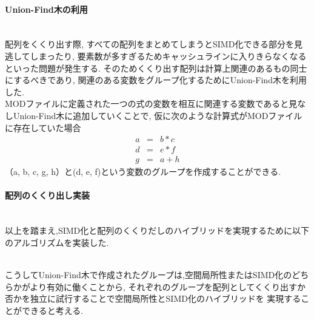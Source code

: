 \paragraph{Union-Find木の利用}~\\
配列をくくり出す際, すべての配列をまとめてしまうとSIMD化できる部分を見逃してしまったり,
要素数が多すぎるためキャッシュラインに入りきらなくなるといった問題が発生する.
そのためくくり出す配列は計算上関連のあるもの同士にするべきであり, 関連のある変数をグループ化するためにUnion-Find木を利用した.\\
MODファイルに定義された一つの式の変数を相互に関連する変数であると見なしUnion-Find木に追加していくことで, 仮に次のような計算式がMODファイルに存在していた場合
\begin{eqnarray}
  a &=& b * c\\
  d &=& e * f\\
  g &=& a + h
\label{eq:3x0}
\end{eqnarray}
（a, b, c, g, h）と(d, e, f)という変数のグループを作成することができる.\\

\paragraph{配列のくくり出し実装}~\\

以上を踏まえ,SIMD化と配列のくくりだしのハイブリッドを実現するために以下のアルゴリズムを実装した.\\

{\footnotesize

}~\\
こうしてUnion-Find木で作成されたグループは,空間局所性またはSIMD化のどちらかがより有効に働くことから,
それぞれのグループを配列としてくくり出すか否かを独立に試行することで空間局所性とSIMD化のハイブリッドを
実現することができると考える.\\
